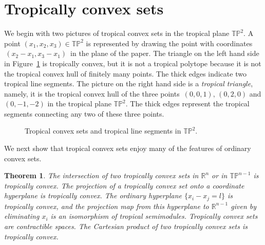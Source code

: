 \documentclass[11pt]{amsart}
\newtheorem{thm}{Theorem}
\newcommand{\RR}{\mathbb{R}}
\newcommand{\TP}{\mathbb{TP}}
\begin{document}
\section{Tropically convex sets}

We begin with two pictures of tropical convex sets in
the tropical plane $\TP^2$. A point $(x_1,x_2,x_3)
\in \TP^2$ is represented by drawing
the point with coordinates $\,(x_2-x_1,x_3-x_1)\,$
in the plane of the paper. The triangle on the left hand side in
Figure~\ref{tropconv}
is tropically convex, but it is not a tropical polytope
because it is not the tropical convex hull
of finitely many points. The thick edges indicate
two tropical line segments. The picture on the
right hand side is a \emph{tropical triangle}, namely,
it is the tropical convex hull of the three points
$\, (0,0,1), \, (0,2,0) $ and $(0,-1,-2)$ in the tropical plane
$\TP^2$. The thick
edges represent the tropical segments connecting
any two of these three points.


\begin{figure}
 
\caption{\label{tropconv}
Tropical convex sets and tropical line segments in $\TP^2$.
}
\end{figure}

We next show that
tropical convex sets enjoy many of the features of ordinary convex sets.

\begin{thm} \label{LotsOfStuff}
The intersection of
two tropically convex sets  in $\RR^n$ or in $\TP^{n-1}$
is tropically convex.
The projection of a tropically convex set onto a coordinate hyperplane is tropically convex.
The ordinary hyperplane $\{x_i-x_j=l\}$ is tropically convex, and the
projection map from this hyperplane to $\RR^{n-1}$ given by eliminating $x_i$ is an isomorphism of tropical semimodules.
Tropically convex sets are contractible
spaces. The Cartesian product of two tropically convex sets is tropically convex.
\end{thm}
\end{document}
